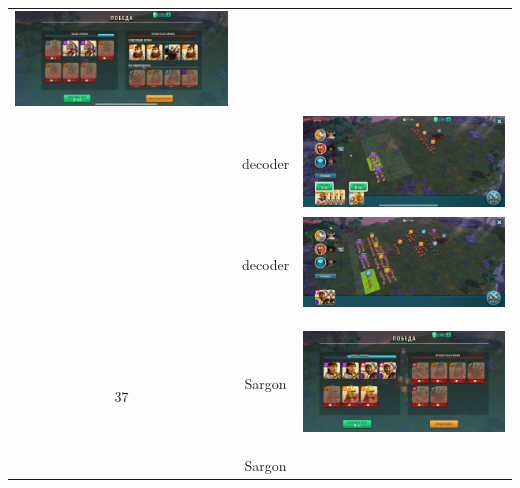 \begin{longtable}{|c|c|c|}
	\includegraphics[width=0.75\linewidth]{./parts/media/TreasureHunt/36/decoder/photo_2022-04-07_10-07-28.jpg} \\
	& decoder &
	\includegraphics[width=0.75\linewidth]{./parts/media/TreasureHunt/36/decoder/photo_2022-04-07_10-07-32.jpg} \\
	& decoder &
	\includegraphics[width=0.75\linewidth]{./parts/media/TreasureHunt/36/decoder/photo_2022-04-07_10-07-13.jpg} \\
	\hline
	\multirow{8}{*}{37} & Sargon &
	\hypertarget{fight37}{\includegraphics[width=0.75\linewidth]{./parts/media/TreasureHunt/37/sargon/photo_2022-04-07_13-17-09.jpg}} \\
	& Sargon &

\end{longtable}
